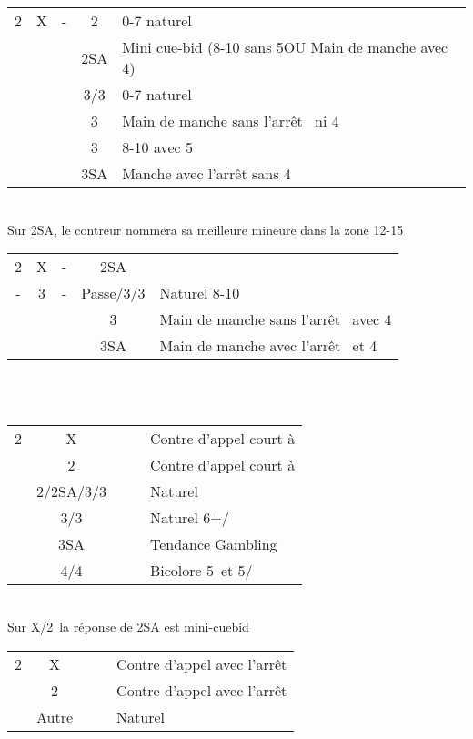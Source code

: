\documentclass[a4paper, oneside, 11pt]{report}
\begin{document}
	\begin{tabular}{cccc|l}
	2\coeur & X & - & 2\pique & 0-7 naturel\\
	&&& 2SA & Mini cue-bid (8-10 sans 5\pique OU Main de manche avec 4\pique)\\
	&&& 3\trefle/3\carreau & 0-7 naturel\\
	&&& 3\coeur & Main de manche sans l'arrêt \coeur\ ni 4\pique\\
	&&& 3\pique & 8-10 avec 5\pique\\
	&&& 3SA & Manche avec l'arrêt \coeur sans 4\pique\\
	\end{tabular}\\
	Sur 2SA,  le contreur nommera sa meilleure mineure dans la zone 12-15\\

	\begin{tabular}{cccc|l}
	2\coeur & X & - & 2SA &\\
	- & 3\trefle & - & Passe/3\carreau/3\pique & Naturel 8-10\\
	 &&& 3\coeur & Main de manche sans l'arrêt \coeur\ avec 4\pique\\
	 &&& 3SA & Main de manche avec l'arrêt \coeur\ et 4\pique\\
	\end{tabular}\\\\

	\begin{tabular}{cccc|l}
	2\carreau & X &&& Contre d'appel court à \pique\\
	& 2\coeur &&& Contre d'appel court à \coeur\\
	& 2\pique/2SA/3\trefle/3\carreau &&& Naturel\\
	& 3\coeur/3\pique &&& Naturel 6+\coeur/\pique\\
	& 3SA &&& Tendance Gambling\\
	& 4\trefle/4\carreau &&& Bicolore 5\pique\ et 5\trefle/\carreau\\
	\end{tabular}\\
	Sur X/2\coeur\ la réponse de 2SA est mini-cuebid\\
	
	\begin{tabular}{cccc|l}
	2\coeur & X &&& Contre d'appel avec l'arrêt \coeur\\
	& 2\pique &&& Contre d'appel avec l'arrêt \pique\\
	& Autre &&& Naturel\\
	\end{tabular}\\\\
\end{document}
